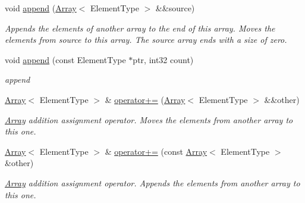 \begin{DoxyCompactItemize}
\mbox{\label{class_arcana_1_1_array_aca40297996dfef58203d696aae1c14e0}} 
void \mbox{\hyperlink{class_arcana_1_1_array_aca40297996dfef58203d696aae1c14e0}{append}} (\mbox{\hyperlink{class_arcana_1_1_array}{Array}}$<$ Element\+Type $>$ \&\&source)
\begin{DoxyCompactList}\small\item\em Appends the elements of another array to the end of this array. Moves the elements from source to this array. The source array ends with a size of zero. \end{DoxyCompactList}\item 
\mbox{\label{class_arcana_1_1_array_aa752725a3b448d4b98342e76bec03bac}} 
void \mbox{\hyperlink{class_arcana_1_1_array_aa752725a3b448d4b98342e76bec03bac}{append}} (const Element\+Type $\ast$ptr, int32 count)
\begin{DoxyCompactList}\small\item\em append \end{DoxyCompactList}\item 
\mbox{\label{class_arcana_1_1_array_a297a0424927c11655f0682849dc12b23}} 
\mbox{\hyperlink{class_arcana_1_1_array}{Array}}$<$ Element\+Type $>$ \& \mbox{\hyperlink{class_arcana_1_1_array_a297a0424927c11655f0682849dc12b23}{operator+=}} (\mbox{\hyperlink{class_arcana_1_1_array}{Array}}$<$ Element\+Type $>$ \&\&other)
\begin{DoxyCompactList}\small\item\em \mbox{\hyperlink{class_arcana_1_1_array}{Array}} addition assignment operator. Moves the elements from another array to this one. \end{DoxyCompactList}\item 
\mbox{\label{class_arcana_1_1_array_ad05d0afe40b37ce410fd6d2e83f27a7f}} 
\mbox{\hyperlink{class_arcana_1_1_array}{Array}}$<$ Element\+Type $>$ \& \mbox{\hyperlink{class_arcana_1_1_array_ad05d0afe40b37ce410fd6d2e83f27a7f}{operator+=}} (const \mbox{\hyperlink{class_arcana_1_1_array}{Array}}$<$ Element\+Type $>$ \&other)
\begin{DoxyCompactList}\small\item\em \mbox{\hyperlink{class_arcana_1_1_array}{Array}} addition assignment operator. Appends the elements from another array to this one. \end{DoxyCompactList}\item 

\end{DoxyCompactItemize}
